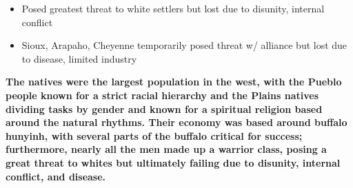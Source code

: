 \documentclass[a4paper]{article}
\begin{document}
{\begin{itemize}
\begin{itemize}
\begin{itemize}
                \item Posed greatest threat to white settlers but lost due to disunity, internal conflict
                \item Sioux, Arapaho, Cheyenne temporarily posed threat w/ alliance but lost due to disease, limited industry
            \end{itemize}
        \end{itemize}
    \end{itemize}
    \textbf{The natives were the largest population in the west, with the Pueblo people known for a strict racial hierarchy and the Plains natives dividing tasks by gender and known for a spiritual religion based around the natural rhythms. Their economy was based around buffalo hunyinh, with several parts of the buffalo critical for success; furthermore, nearly all the men made up a warrior class, posing a great threat to whites but ultimately failing due to disunity, internal conflict, and disease.}}
\end{document}
